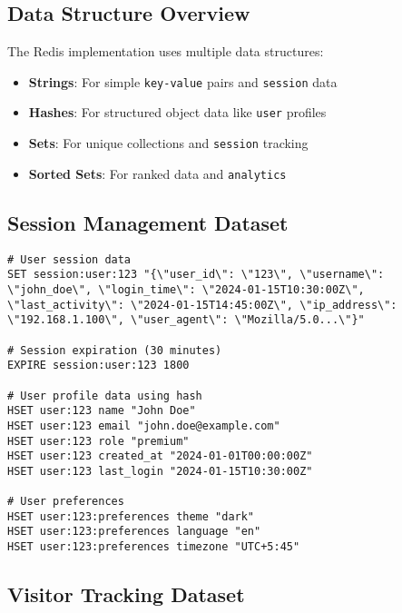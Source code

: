 \subsection{Data Structure Overview}

The Redis implementation uses multiple data structures:
\begin{itemize}
    \item \textbf{Strings}: For simple \texttt{key-value} pairs and \texttt{session} data
    \item \textbf{Hashes}: For structured object data like \texttt{user} profiles
    \item \textbf{Sets}: For unique collections and \texttt{session} tracking
    \item \textbf{Sorted Sets}: For ranked data and \texttt{analytics}
\end{itemize}

\subsection{Session Management Dataset}

\begin{verbatim}
# User session data
SET session:user:123 "{\"user_id\": \"123\", \"username\": \"john_doe\", \"login_time\": \"2024-01-15T10:30:00Z\", \"last_activity\": \"2024-01-15T14:45:00Z\", \"ip_address\": \"192.168.1.100\", \"user_agent\": \"Mozilla/5.0...\"}"

# Session expiration (30 minutes)
EXPIRE session:user:123 1800

# User profile data using hash
HSET user:123 name "John Doe"
HSET user:123 email "john.doe@example.com"
HSET user:123 role "premium"
HSET user:123 created_at "2024-01-01T00:00:00Z"
HSET user:123 last_login "2024-01-15T10:30:00Z"

# User preferences
HSET user:123:preferences theme "dark"
HSET user:123:preferences language "en"
HSET user:123:preferences timezone "UTC+5:45"
\end{verbatim}

\subsection{Visitor Tracking Dataset}

